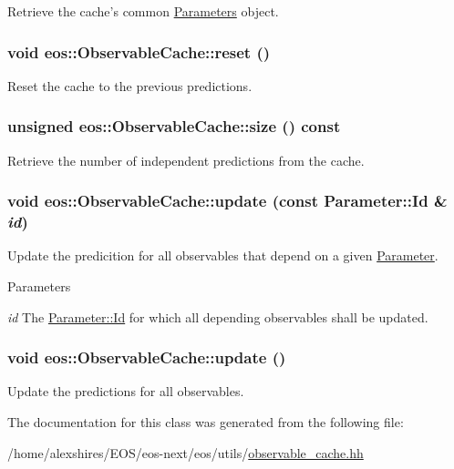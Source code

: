 Retrieve the cache's common \hyperlink{classeos_1_1Parameters}{Parameters} object. \hypertarget{classeos_1_1ObservableCache_a4e1287495ae908ae08a1550a3c5fbdcc}{
\subsubsection[{reset}]{\setlength{\rightskip}{0pt plus 5cm}void eos::ObservableCache::reset ()}}
\label{classeos_1_1ObservableCache_a4e1287495ae908ae08a1550a3c5fbdcc}


Reset the cache to the previous predictions. \hypertarget{classeos_1_1ObservableCache_a8cf868c54289d6ec010c72cdab954ded}{
\subsubsection[{size}]{\setlength{\rightskip}{0pt plus 5cm}unsigned eos::ObservableCache::size () const}}
\label{classeos_1_1ObservableCache_a8cf868c54289d6ec010c72cdab954ded}


Retrieve the number of independent predictions from the cache. \hypertarget{classeos_1_1ObservableCache_a934c9c731189f013eb69a79112b64a04}{
\subsubsection[{update}]{\setlength{\rightskip}{0pt plus 5cm}void eos::ObservableCache::update (const {\bf Parameter::Id} \& {\em id})}}
\label{classeos_1_1ObservableCache_a934c9c731189f013eb69a79112b64a04}
Update the predicition for all observables that depend on a given \hyperlink{classeos_1_1Parameter}{Parameter}.


\begin{DoxyParams}{Parameters}
\item[{\em id}]The \hyperlink{classeos_1_1Parameter_a065f55e66b2128cc5f14339e676d833a}{Parameter::Id} for which all depending observables shall be updated. \end{DoxyParams}
\hypertarget{classeos_1_1ObservableCache_ae69a231f0546cabd80266f4c0fb8b49f}{
\subsubsection[{update}]{\setlength{\rightskip}{0pt plus 5cm}void eos::ObservableCache::update ()}}
\label{classeos_1_1ObservableCache_ae69a231f0546cabd80266f4c0fb8b49f}


Update the predictions for all observables. 

The documentation for this class was generated from the following file:\begin{DoxyCompactItemize}
\item 
/home/alexshires/EOS/eos-\/next/eos/utils/\hyperlink{observable__cache_8hh}{observable\_\-cache.hh}\end{DoxyCompactItemize}

